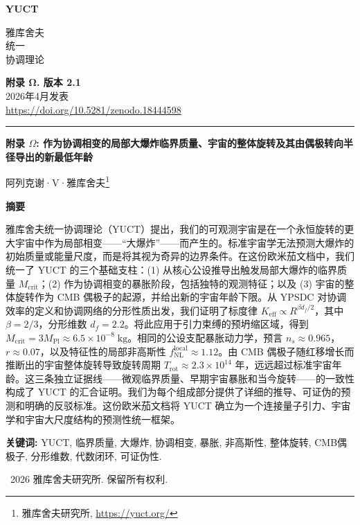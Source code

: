 \documentclass[11pt,a4paper]{article}
\newcommand{\Keff}{K_{\mathrm{eff}}}
\newcommand{\makeheader}{%
	\noindent
	\begin{minipage}{0.17\textwidth}
		\raggedright
		{\sffamily\bfseries\color{skyblue}\fontsize{46}{46}\selectfont YUCT}%
	\end{minipage}%
	\hspace{30pt}
	\begin{minipage}{0.32\textwidth}
		\raggedright
		{\sffamily\fontsize{11}{13}\selectfont 雅库舍夫\\ 统一\\ 协调理论}%
	\end{minipage}%
	\hfill
	\begin{minipage}{0.38\textwidth}
		\raggedleft
		{\sffamily\bfseries 附录 Ω. 版本 2.1}\\
		{\sffamily 2026年4月发表}\\
		{\sffamily\footnotesize \url{https://doi.org/10.5281/zenodo.18444598}}%
	\end{minipage}
	\par\vspace{5pt}
	\noindent\textcolor{gold}{\rule{\textwidth}{1.6pt}}
	\par\vspace{0pt}
}
\begin{document}
	\renewcommand{\thepage}{\arabic{page}}
	\thispagestyle{firstpage}
	\makeheader
	
	\vspace{0cm}
	{\LARGE\bfseries 附录 \(\Omega\): 作为协调相变的局部大爆炸临界质量、宇宙的整体旋转及其由偶极转向半径导出的新最低年龄 \par}
	\vspace{0.2cm}
	
	{\large 阿列克谢·V·雅库舍夫\footnote{雅库舍夫研究所, \url{https://yuct.org/}}} \\
	\vspace{0.0cm}
	
	{\color{darkblue}\textbf{\LARGE 摘要}} \par
	{\large
		\noindent
		雅库舍夫统一协调理论（YUCT）提出，我们的可观测宇宙是在一个永恒旋转的更大宇宙中作为局部相变——“大爆炸”——而产生的。标准宇宙学无法预测大爆炸的初始质量或能量尺度，而是将其视为奇异的边界条件。在这份欧米茄文档中，我们统一了 YUCT 的三个基础支柱：(1) 从核心公设推导出触发局部大爆炸的临界质量 \(M_{\mathrm{crit}}\)；(2) 作为协调相变的暴胀阶段，包括独特的观测特征；以及 (3) 宇宙的整体旋转作为 CMB 偶极子的起源，并给出新的宇宙年龄下限。从 YPSDC 对协调效率的定义和协调网络的分形性质出发，我们证明了标度律 \(\Keff \propto R^{\beta d_f/2}\)，其中 \(\beta = 2/3\)，分形维数 \(d_f = 2.2\)。将此应用于引力束缚的预坍缩区域，得到 \(M_{\mathrm{crit}} = 3 M_{\mathrm{Pl}} \approx 6.5 \times 10^{-8}\;\text{kg}\)。相同的公设支配暴胀动力学，预言 \(n_s \approx 0.965\)，\(r \approx 0.07\)，以及特征性的局部非高斯性 \(f_{\mathrm{NL}}^{\mathrm{local}} \approx 1.12\)。由 CMB 偶极子随红移增长而推断出的宇宙整体旋转导致旋转周期 \(T_{\mathrm{rot}} \approx 2.3 \times 10^{14}\) 年，远远超过标准宇宙年龄。这三条独立证据线——微观临界质量、早期宇宙暴胀和当今旋转——的一致性构成了 YUCT 的汇合证明。我们为每个组成部分提供了详细的推导、可证伪的预测和明确的反驳标准。这份欧米茄文档将 YUCT 确立为一个连接量子引力、宇宙学和宇宙大尺度结构的预测性统一框架。
	}
	
	\vspace{0.1cm}
	\noindent
	{\color{darkblue}\textbf{关键词:}} YUCT, 临界质量, 大爆炸, 协调相变, 暴胀, 非高斯性, 整体旋转, CMB偶极子, 分形维数, 代数闭环, 可证伪性.
	
	\vspace{0.5cm}
	\noindent
	\textcopyright\ 2026 雅库舍夫研究所. 保留所有权利.
	
	\tableofcontents
	\newpage
	
\end{document}
